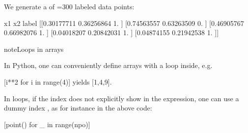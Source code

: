 \documentclass[a4paper,12pt,polish]{jupyterBook}
\begin{document}
\sphinxAtStartPar
We generate a  of =300 labeled data points:
\begin{sphinxVerbatimInput}

\begin{sphinxVerbatim}[commandchars=\\\{\}]
 

       
\PYG{p}{[}    \PYG{p}{]} 
\PYG{p}{[} \PYG{p}{]}                           
\end{sphinxVerbatim}
\end{sphinxVerbatimInput}
\begin{sphinxVerbatimOutput}

\begin{sphinxVerbatim}[commandchars=\\\{\}]
  x1         x2         label
[[0.30177711 0.36256864 1.        ]
 [0.74563557 0.63263509 0.        ]
 [0.46905767 0.66982076 1.        ]
 [0.04018207 0.20842031 1.        ]
 [0.04874155 0.21942538 1.        ]]
\end{sphinxVerbatim}
\end{sphinxVerbatimOutput}

\begin{sphinxadmonition}{note}{Loops in arrays}

\sphinxAtStartPar
In Python, one can conveniently define arrays with a loop inside, e.g.

\sphinxAtStartPar
{[}i**2 for i in range(4){]} yields {[}1,4,9{]}.

\sphinxAtStartPar
In loops, if the index does not explicitly show in the expression, one can use a dummy index \sphinxstylestrong{\_}, as for instance in the above code:

\sphinxAtStartPar
{[}point() for \_ in range(npo){]}
\end{sphinxadmonition}
\end{document}
